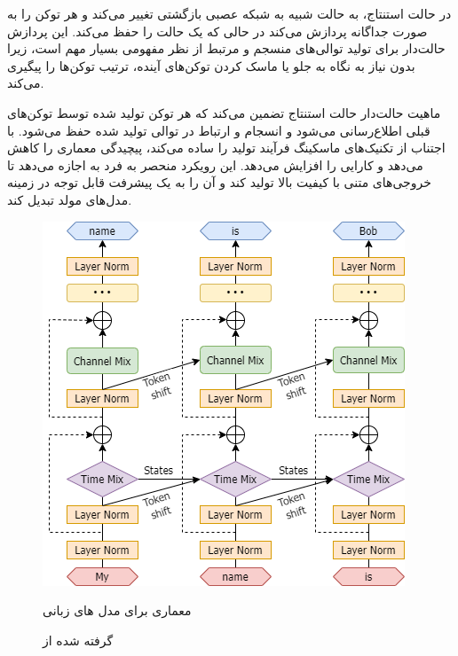 در حالت استنتاج،  به حالت شبیه به شبکه عصبی بازگشتی تغییر می‌کند و هر توکن را به صورت جداگانه پردازش می‌کند در حالی که یک حالت  را حفظ می‌کند. این پردازش حالت‌دار برای تولید توالی‌های منسجم و مرتبط از نظر مفهومی بسیار مهم است، زیرا بدون نیاز به نگاه به جلو  یا ماسک  کردن توکن‌های آینده، ترتیب توکن‌ها را پیگیری می‌کند.

ماهیت حالت‌دار حالت استنتاج  تضمین می‌کند که هر توکن تولید شده توسط توکن‌های قبلی اطلاع‌رسانی می‌شود و انسجام و ارتباط در توالی تولید شده حفظ می‌شود. با اجتناب از تکنیک‌های ماسکینگ  فرآیند تولید را ساده می‌کند، پیچیدگی معماری را کاهش می‌دهد و کارایی را افزایش می‌دهد. این رویکرد منحصر به فرد به  اجازه می‌دهد تا خروجی‌های متنی با کیفیت بالا تولید کند و آن را به یک پیشرفت قابل توجه در زمینه مدل‌های مولد تبدیل کند.

\begin{figure}[!htb]
      \centering
      \includegraphics[scale=0.5]{Figures/RWKV-arch.png}
      \caption{معماری  برای مدل های زبانی}
      \vspace{0.7em}
      \caption*{گرفته شده از \cite{RWKV}}
      \label{Fig:RWKV}
\end{figure}

